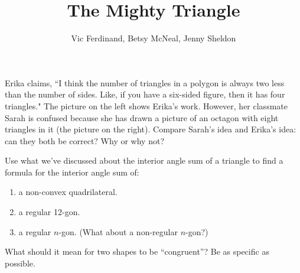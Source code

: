\documentclass[nooutcomes]{ximera}
\title{The Mighty Triangle}
\author{Vic Ferdinand, Betsy McNeal, Jenny Sheldon}
\begin{document}
\begin{abstract}
\end{abstract}
\maketitle



\begin{problem}
Erika claims, ``I think the number of triangles in a polygon is always two less than the number of sides.  Like, if you have a six-sided figure, then it has four triangles."  The picture on the left shows Erika's work.  However, her classmate Sarah is confused because she has drawn a picture of an octagon with eight triangles in it (the picture on the right). Compare Sarah's idea and Erika's idea: can they both be correct? Why or why not?

		\begin{center}
		\end{center}
\end{problem}

\begin{problem}
Use what we've discussed about the interior angle sum of a triangle to find a formula for the interior angle sum of:
\begin{enumerate}
    \item a non-convex quadrilateral.
    \item a regular 12-gon.
    \item a regular $n$-gon. (What about a non-regular $n$-gon?)
\end{enumerate}


\end{problem}

\newpage
\begin{problem}
What should it mean for two shapes to be ``congruent''?  Be as specific as possible.
\end{problem}
\end{document}
